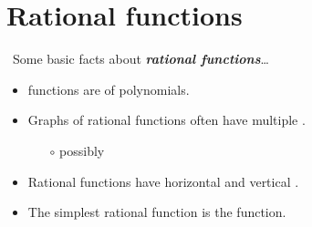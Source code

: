 \section{Rational functions}

\begin{myConcept}{~Some basic facts about {\bfseries\itshape rational functions}\dots}
    \begin{itemize}[nosep]
        \item {} functions are  of polynomials.\\
        {
        }
        \item Graphs of rational functions often have multiple .
        \begin{itemize}[nosep]
            \item[$\circ$] possibly  
        \end{itemize}
        \item Rational functions have horizontal and vertical .
        \item The simplest rational function is the  function.
    \end{itemize}
\end{myConcept}